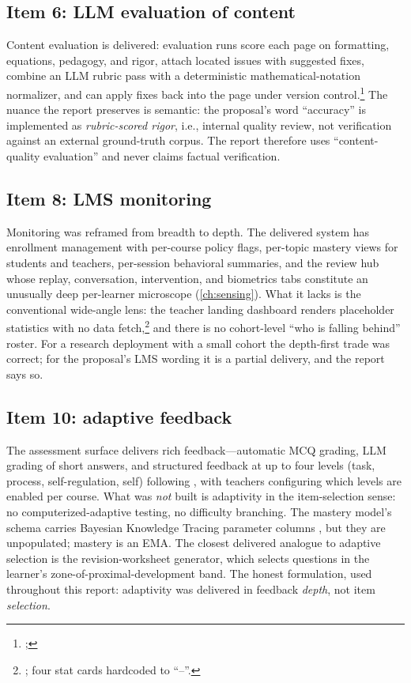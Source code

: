 \subsection{Item 6: LLM evaluation of content}
\label{sec:scope-item6}

Content evaluation is delivered: evaluation runs score each page on
formatting, equations, pedagogy, and rigor, attach located issues with
suggested fixes, combine an LLM rubric pass with a deterministic
mathematical-notation normalizer, and can apply fixes back into the page
under version control.\footnote{;
} The nuance the report preserves is semantic:
the proposal's word ``accuracy'' is implemented as \emph{rubric-scored
rigor}, i.e., internal quality review, not verification against an
external ground-truth corpus. The report therefore uses
``content-quality evaluation'' and never claims factual verification.

\subsection{Item 8: LMS monitoring}
\label{sec:scope-item8}

Monitoring was reframed from breadth to depth. The delivered system has
enrollment management with per-course policy flags, per-topic mastery
views for students and teachers, per-session behavioral summaries, and
the review hub whose replay, conversation, intervention, and biometrics
tabs constitute an unusually deep per-learner microscope
(\cref{ch:sensing}). What it lacks is the conventional wide-angle lens:
the teacher landing dashboard renders placeholder statistics with no data
fetch,\footnote{;
four stat cards hardcoded to ``--''.} and there is no cohort-level
``who is falling behind'' roster. For a research deployment with a small
cohort the depth-first trade was correct; for the proposal's LMS wording
it is a partial delivery, and the report says so.

\subsection{Item 10: adaptive feedback}
\label{sec:scope-item10}

The assessment surface delivers rich feedback---automatic MCQ grading,
LLM grading of short answers, and structured feedback at up to four
levels (task, process, self-regulation, self) following
\citet{hattie2007}, with teachers configuring which levels are enabled
per course. What was \emph{not} built is adaptivity in the
item-selection sense: no computerized-adaptive testing, no difficulty
branching. The mastery model's schema carries Bayesian Knowledge Tracing
parameter columns \citep{corbett1995}, but they are unpopulated; mastery
is an EMA. The closest delivered analogue to adaptive selection is the
revision-worksheet generator, which selects questions in the learner's
zone-of-proximal-development band. The honest formulation, used
throughout this report: adaptivity was delivered in feedback
\emph{depth}, not item \emph{selection}.

